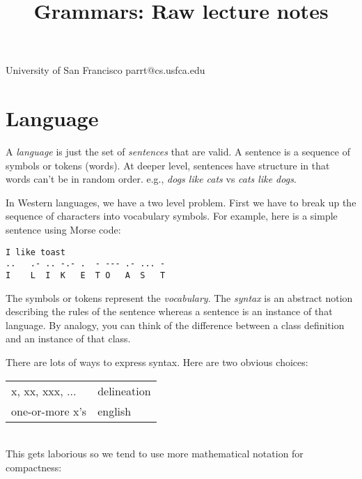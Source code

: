\documentclass[11pt,twocolumn,nocopyright]{sigplanconf}
\begin{document}
\title{Grammars: Raw lecture notes}

           {University of San Francisco\vspace{-1mm}}
           {parrt@cs.usfca.edu}

\maketitle

\begin{abstract}
\end{abstract}

\section{Language}

A {\em language} is just the set of {\em sentences} that are valid. A sentence is a sequence of symbols or tokens (words).  At deeper level, sentences have structure in that words can't be in random order. e.g., {\em dogs like cats} vs {\em cats like dogs}.

In Western languages, we have a two level problem. First we have to break up the sequence of characters into vocabulary symbols. For example, here is a simple sentence using Morse code:

\begin{verbatim}
I like toast
..   .- .. -.- .  - --- .- ... -
I    L  I  K   E  T O   A  S   T
\end{verbatim}

The symbols or tokens represent the {\em vocabulary}. The {\em syntax} is an abstract notion describing the rules of the sentence whereas a sentence is an instance of that language. By analogy, you can think of the difference between a class definition and an instance of that class.

There are lots of ways to express syntax. Here are two obvious choices:\\

\begin{tabular}{ll}
x, xx, xxx, ...	 & delineation\\
one-or-more x's	 & english\\
\end{tabular}
~\\

This gets laborious so we tend to use more mathematical notation for compactness:\\
\end{document}
